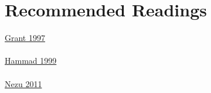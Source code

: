 \documentclass{article} %
\begin{document}
\section{Recommended Readings}

\href{https://github.com/LukasWolff2002/Lab_2_FM/blob/main/LECTURAS/Grant_1997.pdf}{Grant 1997}
\\ \\
\href{https://github.com/LukasWolff2002/Lab_2_FM/blob/main/LECTURAS/Hammad_1999.pdf}{Hammad 1999}
\\ \\
\href{https://github.com/LukasWolff2002/Lab_2_FM/blob/main/LECTURAS/Nezu_2011.pdf}{Nezu 2011}
\end{document}
